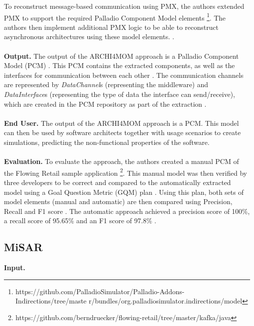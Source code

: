 To reconstruct message-based communication using PMX, the authors extended PMX to support the required Palladio Component Model elements \footnote{https://github.com/PalladioSimulator/Palladio-Addons-Indirections/tree/maste r/bundles/org.palladiosimulator.indirections/model}.
The authors then implement additional PMX logic to be able to reconstruct asynchronous architectures using these model elements.
\cite{Singh2022ARCHI4MOM}.
\\ \\
\textbf{Output.}
The output of the ARCHI4MOM approach is a Palladio Component Model (PCM) \cite{Singh2022ARCHI4MOM}.
This PCM contains the extracted components, as well as the interfaces for communication between each other \cite{Singh2022ARCHI4MOM}.
The communication channels are represented by \textit{DataChannel}s (representing the middleware) and \textit{DataInterface}s (representing the type of data the interface can send/receive), which are created in the PCM repository as part of the extraction \cite{Singh2022ARCHI4MOM}.
\\ \\
\textbf{End User.}
The output of the ARCHI4MOM approach is a PCM.
This model can then be used by software architects together with usage scenarios to create simulations, predicting the non-functional properties of the software.
\\ \\
\textbf{Evaluation.}
To evaluate the approach, the authors created a manual PCM of the Flowing Retail sample application \footnote{https://github.com/berndruecker/flowing-retail/tree/master/kafka/java}.
This manual model was then verified by three developers to be correct and compared to the automatically extracted model using a Goal Question Metric (GQM) plan \cite{VanSolingen2002GQM,Singh2022ARCHI4MOM}.
Using this plan, both sets of model elements (manual and automatic) are then compared using Precision, Recall and F1 score \cite{Singh2022ARCHI4MOM}.
The automatic approach achieved a precision score of 100\%, a recall score of 95.65\% and an F1 score of 97.8\% \cite{Singh2022ARCHI4MOM}.

\subsection{MiSAR}
\label{sec:Results:MiSAR}
\textbf{Input.}





